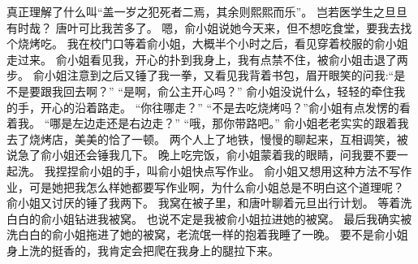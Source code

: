 真正理解了什么叫“盖一岁之犯死者二焉，其余则熙熙而乐”。
岂若医学生之旦旦有时哉？
唐叶可比我苦多了。
嗯，俞小姐说她今天来，但不想吃食堂，要我去找个烧烤吃。
我在校门口等着俞小姐，大概半个小时之后，看见穿着校服的俞小姐走过来。
俞小姐看见我，开心的扑到我身上，我有点禁不住，被俞小姐击退了两步。
俞小姐注意到之后又锤了我一拳，又看见我背着书包，眉开眼笑的问我:“是不是要跟我回去啊？”
“是啊，俞公主开心吗？”
俞小姐没说什么，轻轻的牵住我的手，开心的沿着路走。
“你往哪走？”
“不是去吃烧烤吗？”俞小姐有点发愣的看着我。
“哪是左边走还是右边走？”
“哦，那你带路吧。”
俞小姐老老实实的跟着我去了烧烤店，美美的恰了一顿。
两个人上了地铁，慢慢的聊起来，互相调笑，被说急了俞小姐还会锤我几下。
晚上吃完饭，俞小姐蒙着我的眼睛，问我要不要一起洗。
我捏捏俞小姐的手，叫俞小姐快点写作业。
俞小姐又想用这种方法不写作业，可是她把我怎么样她都要写作业啊，为什么俞小姐总是不明白这个道理呢？
俞小姐又讨厌的锤了我两下。
我窝在被子里，和唐叶聊着元旦出行计划。
等着洗白白的俞小姐钻进我被窝。
也说不定是我被俞小姐拉进她的被窝。
最后我确实被洗白白的俞小姐拖进了她的被窝，老流氓一样的抱着我睡了一晚。
要不是俞小姐身上洗的挺香的，我肯定会把爬在我身上的腿拉下来。

